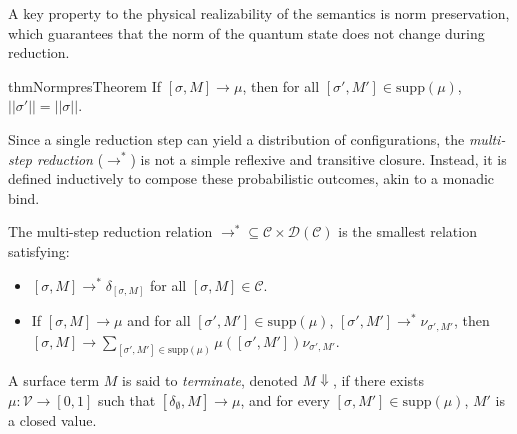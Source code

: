 A key property to the physical realizability of the semantics is norm preservation, which guarantees that the norm of the quantum state does not change during reduction.
\begin{restatable}{thm}{NormpresTheorem} \label{thm:norm-pres}
  If $[\sigma,M] \longrightarrow \mu$, then for all $[\sigma',M']\in\mathrm{supp}(\mu)$, $||\sigma'|| = ||\sigma||$.
\end{restatable}

Since a single reduction step can yield a distribution of configurations, the \textit{multi-step reduction} ($\longrightarrow^*$) is not a simple reflexive and transitive closure. Instead, it is defined inductively to compose these probabilistic outcomes, akin to a monadic bind.
\begin{dfn}
  The multi-step reduction relation $\longrightarrow^*\subseteq \mathcal{C}\times \mathcal{D}(\mathcal{C})$ is the smallest relation satisfying:
  \begin{itemize}
    \item $[\sigma,M] \longrightarrow^*\delta_{[\sigma,M]}$ for all $[\sigma,M]\in\mathcal{C}$.
    \item If $[\sigma,M] \longrightarrow \mu$ and for all $[\sigma',M']\in\mathrm{supp}(\mu)$, $[\sigma',M'] \longrightarrow^*\nu_{\sigma',M'}$, then $[\sigma,M] \longrightarrow\sum_{[\sigma',M']\in\mathrm{supp}(\mu)} \mu([\sigma',M'])\nu_{\sigma',M'}$.
  \end{itemize}
\end{dfn}

\begin{dfn}[Termination]
  A surface term $M$ is said to \emph{terminate}, denoted $M\Downarrow$, if there exists $\mu : \mathcal{V} \to [0,1]$ such that $[\delta_\emptyset, M] \longrightarrow\mu$, and for every $[\sigma, M'] \in \mathrm{supp}(\mu)$, $M'$ is a closed value.
\end{dfn}
